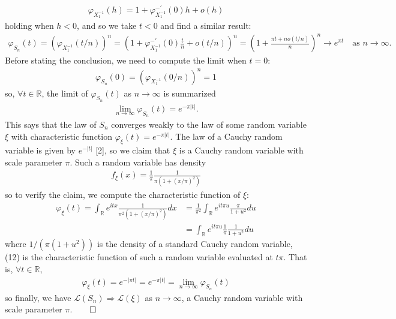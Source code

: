 \documentclass[10pt]{article}
\newcommand{\bp}[1]{\left({#1}\right)}
\newcommand{\mbb}[1]{\mathbb{#1}}
\newcommand{\1}[1]{\mathbbm{1}_{#1}}
\newcommand{\mc}[1]{\mathcal{#1}}
\begin{document}
    \begin{align*}
        \varphi_{X_1^{-1}}(h)=1+\varphi_{X_1^{-1}}^{-\prime}(0)h+o(h)
    \end{align*}
    holding when $h<0$, and so we take $t<0$ and find a similar result:
    \begin{align*}
        \varphi_{S_n}(t)=(\varphi_{X_1^{-1}}(t/n))^n=\bp{1+\varphi_{X_1^{-1}}^{-\prime}(0)\frac{t}{n}+o(t/n)}^n=\bp{1+\frac{\pi t+no(t/n)}{n}}^n\longrightarrow e^{\pi t}\quad\text{as $n\rightarrow\infty$}.\tag{10}
    \end{align*}
    Before stating the conclusion, we need to compute the limit when $t=0$:
    \begin{align*}
        \varphi_{S_n}(0)=(\varphi_{X_1^{-1}}(0/n))^n=1\tag{11}
    \end{align*}
    so, $\forall t\in\mbb{R}$, the limit of $\varphi_{S_n}(t)$ as $n\rightarrow\infty$ is summarized
    \begin{align*}
        \lim_{n\rightarrow\infty}\varphi_{S_n}(t)=e^{-\pi|t|}.
    \end{align*}
    This says that the law of $S_n$ converges weakly to the law of some random variable $\xi$ with characteristic function $\varphi_\xi(t)=e^{-\pi|t|}$. 
    The law of a Cauchy random variable is given by $e^{-|t|}$ [2], so we claim that $\xi$ is a Cauchy random variable with scale parameter $\pi$. Such a random variable has density
    \begin{align*}
        f_\xi(x)=\frac{1}{\pi}\frac{1}{\pi(1+(x/\pi)^2)}
    \end{align*} 
    so to verify the claim, we compute the characteristic function of $\xi$:
    \begin{align*}
        \varphi_\xi(t)=\int_\mbb{R}e^{itx}\frac{1}{\pi^2(1+(x/\pi)^2)}dx&=\frac{1}{\pi^2}\int_\mbb{R}e^{it\pi u}\frac{\pi}{1+u^2}du\tag{setting $u=x/\pi$}\\
        &=\int_\mbb{R}e^{it\pi u}\frac{1}{\pi}\frac{1}{1+u^2}du\tag{12}
    \end{align*}
    where $1/(\pi(1+u^2))$ is the density of a standard Cauchy random variable, (12) is the characteristic function of such a random variable evaluated at $t\pi$. That is, $\forall t\in\mbb{R}$,
    \begin{align*}
        \varphi_\xi(t)=e^{-|\pi t|}=e^{-\pi|t|}=\lim_{n\rightarrow\infty}\varphi_{S_n}(t)
    \end{align*}
    so finally, we have $\mc{L}(S_n)\Longrightarrow\mc{L}(\xi)$ as $n\rightarrow\infty$, a Cauchy random variable with scale parameter $\pi$.\hfill{$\qed$}\\[15pt]
\end{document}
